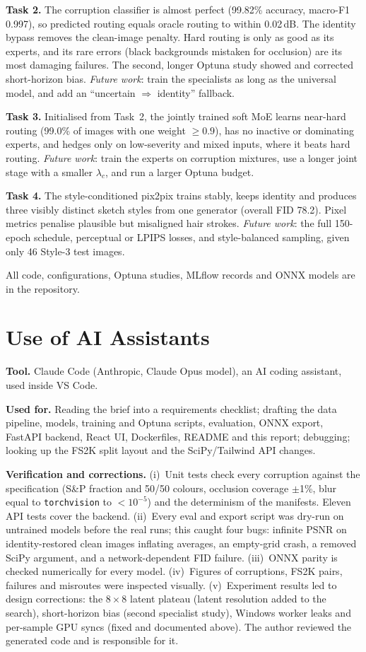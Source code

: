 ﻿\documentclass[conference]{IEEEtran}
\begin{document}
\textbf{Task 2.} The corruption classifier is almost perfect (99.82\% accuracy, macro-F1 0.997), so
predicted routing equals oracle routing to within 0.02\,dB. The identity bypass removes the clean-image
penalty. Hard routing is only as good as its experts, and its rare errors (black backgrounds mistaken
for occlusion) are its most damaging failures. The second, longer Optuna study showed and corrected
short-horizon bias. \emph{Future work}: train the specialists as long as the universal model, and add an
``uncertain $\Rightarrow$ identity'' fallback.

\textbf{Task 3.} Initialised from Task~2, the jointly trained soft MoE learns near-hard routing
(99.0\% of images with one weight $\ge0.9$), has no inactive or dominating experts, and hedges only on
low-severity and mixed inputs, where it beats hard routing. \emph{Future work}: train the experts on
corruption mixtures, use a longer joint stage with a smaller $\lambda_c$, and run a larger Optuna budget.

\textbf{Task 4.} The style-conditioned pix2pix trains stably, keeps identity and produces three
visibly distinct sketch styles from one generator (overall FID 78.2). Pixel metrics penalise plausible
but misaligned hair strokes. \emph{Future work}: the full 150-epoch schedule, perceptual or LPIPS
losses, and style-balanced sampling, given only 46 Style-3 test images.

All code, configurations, Optuna studies, MLflow records and ONNX models are in the repository.




\appendices
\section{Use of AI Assistants}
\textbf{Tool.} Claude Code (Anthropic, Claude Opus model), an AI coding assistant, used inside VS Code.

\textbf{Used for.} Reading the brief into a requirements checklist; drafting the data pipeline,
models, training and Optuna scripts, evaluation, ONNX export, FastAPI backend, React UI, Dockerfiles,
README and this report; debugging; looking up the FS2K split layout and the
SciPy/Tailwind API changes.

\textbf{Verification and corrections.} (i)~Unit tests check every corruption against the specification
(S\&P fraction and 50/50 colours, occlusion coverage $\pm$1\%, blur equal to \texttt{torchvision} to
$<10^{-5}$) and the determinism of the manifests. Eleven API tests cover the backend. (ii)~Every eval
and export script was dry-run on untrained models before the real runs; this caught four bugs:
infinite PSNR on identity-restored clean images inflating averages, an empty-grid crash, a removed
SciPy argument, and a network-dependent FID failure. (iii)~ONNX parity is checked numerically for
every model. (iv)~Figures of corruptions, FS2K pairs, failures and misroutes were inspected visually.
(v)~Experiment results led to design corrections: the $8\times8$ latent plateau (latent resolution
added to the search), short-horizon bias (second specialist study), Windows worker leaks and
per-sample GPU syncs (fixed and documented above). The author reviewed the generated code and is
responsible for it.
\end{document}

